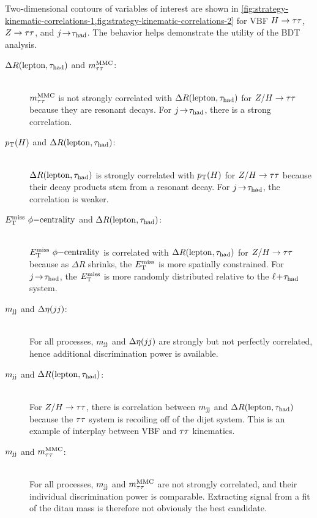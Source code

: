 Two-dimensional contours of variables of interest are shown in \cref{fig:strategy-kinematic-correlations-1,fig:strategy-kinematic-correlations-2} for VBF $H\rightarrow\tau\tau$, $Z\rightarrow\tau\tau$, and $j\!\rightarrow\!\tau_\text{had}$. The behavior helps demonstrate the utility of the BDT analysis.
% 
\begin{description}
    \item[$\Delta{}R(\mathrm{lepton}, \tau_\text{had})$ and $m_{\tau\tau}^\text{MMC}$:] \hfill \\
      $m_{\tau\tau}^\text{MMC}$ is not strongly correlated with $\Delta{}R(\mathrm{lepton}, \tau_\text{had})$ for $Z/H\rightarrow\tau\tau$ because they are resonant decays. For $j\!\rightarrow\!\tau_\text{had}$, there is a strong correlation. 
    \item[$p_{\mathrm{T}}(H)$ and $\Delta{}R(\mathrm{lepton}, \tau_\text{had})$:] \hfill \\
      $\Delta{}R(\mathrm{lepton}, \tau_\text{had})$ is strongly correlated with $p_{\mathrm{T}}(H)$ for $Z/H\rightarrow\tau\tau$ because their decay products stem from a resonant decay. For $j\!\rightarrow\!\tau_\text{had}$, the correlation is weaker.
    \item[$E_{\mathrm{T}}^{\mathrm{miss}}\ \phi\mathrm{-centrality}$ and $\Delta{}R(\mathrm{lepton}, \tau_\text{had})$:] \hfill \\
      $E_{\mathrm{T}}^{\mathrm{miss}}\ \phi\mathrm{-centrality}$ is correlated with $\Delta{}R(\mathrm{lepton}, \tau_\text{had})$ for $Z/H\rightarrow\tau\tau$ because as $\Delta R$ shrinks, the $E_{\mathrm{T}}^{\mathrm{miss}}$ is more spatially constrained. For $j\!\rightarrow\!\tau_\text{had}$, the $E_{\mathrm{T}}^{\mathrm{miss}}$ is more randomly distributed relative to the $\ell\!+\!\tau_\text{had}$ system.
    \item[$m_{\text{jj}}$ and $\deta$:] \hfill \\
      For all processes, $m_{\text{jj}}$ and $\deta$ are strongly but not perfectly correlated, hence additional discrimination power is available.
    \item[$m_{\text{jj}}$ and $\Delta{}R(\mathrm{lepton}, \tau_\text{had})$:] \hfill \\
      For $Z/H\rightarrow\tau\tau$, there is correlation between $m_{\text{jj}}$ and $\Delta{}R(\mathrm{lepton}, \tau_\text{had})$ because the $\tau\tau$ system is recoiling off of the dijet system. This is an example of interplay between VBF and $\tau\tau$ kinematics.
    \item[$m_{\text{jj}}$ and $m_{\tau\tau}^\text{MMC}$:] \hfill \\
      For all processes, $m_{\text{jj}}$ and $m_{\tau\tau}^\text{MMC}$ are not strongly correlated, and their individual discrimination power is comparable. Extracting signal from a fit of the ditau mass is therefore not obviously the best candidate.
\end{description}
%

